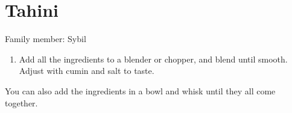 \chapter{Tahini}
\label{ch:tahineh}


Family member: Sybil

\begin{enumerate}
    \item Add all the ingredients to a blender or chopper, and blend until smooth. Adjust with cumin and salt to taste.
\end{enumerate}

You can also add the ingredients in a bowl and whisk until they all come together.
